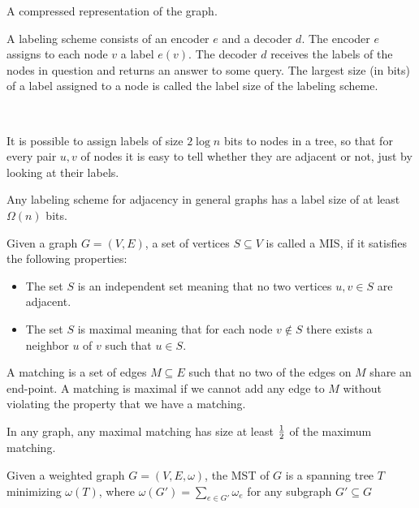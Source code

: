 \documentclass[11pt, oneside]{book}   						%
\begin{document}
\begin{mydef} A compressed representation of the graph.\end{mydef}
\begin{mydef} A labeling scheme consists of an encoder $e$ and a decoder $d$. The encoder $e$ assigns to each node $v$ a label $e(v)$. The decoder $d$ receives the labels of the nodes in question and returns an answer to some query. The largest size (in bits) of a label assigned to a node is called the label size of the labeling scheme.\end{mydef}\hfill\\

\begin{mythm}It is possible to assign labels of size $2\log n$ bits to nodes in a tree, so that for every pair $u,v$ of nodes it is easy to tell whether they are adjacent or not, just by looking at their labels.\end{mythm}
\begin{mythm} Any labeling scheme for adjacency in general graphs has a label size of at least $\Omega(n)$ bits.\end{mythm}
\begin{mydef} Given a graph $G=(V,E)$, a set of vertices $S\subseteq V$ is called a MIS, if it satisfies the following properties:
\begin{itemize}
	\item The set $S$ is an independent set meaning that no two vertices $u,v\in S$ are adjacent.
	\item The set $S$ is maximal meaning that for each node $v\notin S$ there exists a neighbor $u$ of $v$ such that $u\in S$.
\end{itemize}\end{mydef}
\begin{mydef} A matching is a set of edges $M\subseteq E$ such that no two of the edges on $M$ share an end-point. A matching is maximal if we cannot add any edge to $M$ without violating the property that we have a matching.\end{mydef}
\begin{mythm}In any graph, any maximal matching has size at least $\frac{1}{2}$ of the maximum matching.\end{mythm}
\begin{mydef} Given a weighted graph $G=(V,E,\omega)$, the MST of $G$ is a spanning tree $T$ minimizing $\omega(T)$, where $\omega(G')=\sum_{e\in G'}\omega_e$ for any subgraph $G'\subseteq G$\end{mydef}
\end{document}
